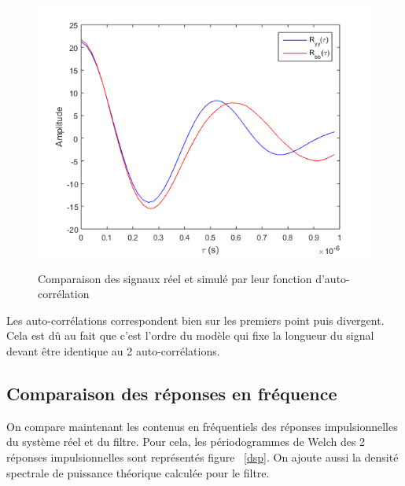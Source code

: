 \documentclass[a4paper]{article}
\begin{document}
\begin{figure}[!h]
	\centering
	\includegraphics[scale=0.7]{autocorr.png}
    \label{autocorr}
    \caption{Comparaison des signaux réel et simulé par leur fonction d'auto-corrélation}
\end{figure}

Les auto-corrélations correspondent bien sur les premiers point puis divergent. Cela est dû au fait que c'est l'ordre du modèle qui fixe la longueur du signal devant être identique au 2 auto-corrélations.

\subsection{Comparaison des réponses en fréquence}
On compare maintenant les contenus en fréquentiels des réponses impulsionnelles du système réel et du filtre. Pour cela, les périodogrammes de Welch des 2 réponses impulsionnelles sont représentés figure ~\ref{dsp}. On ajoute aussi la densité spectrale de puissance théorique calculée pour le filtre.
\end{document}
